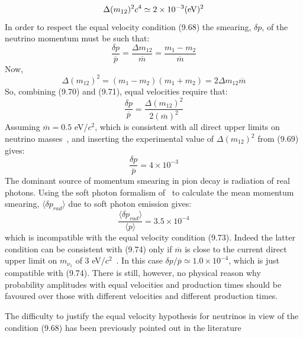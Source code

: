 \documentclass [12pt]{article}
\begin{document}
{       \begin{equation}
      \Delta(m_{12})^2 c^4 \simeq 2 \times 10^{-3} (\rm{eV})^2
        \end{equation}
    In order to respect the equal velocity condition (9.68) the smearing, $\delta p$, of the
    neutrino momentum must be such that:
       \begin{equation}
       \frac{\delta p}{\overline{p}} = \frac{\Delta m_{12}}{\overline{m}} = \frac{m_1-m_2}{\overline{m}} 
       \end{equation}
      Now,
        \begin{equation}
   \Delta(m_{12})^2 = (m_1-m_2)(m_1+m_2) = 2 \Delta m_{12} \overline{m}
      \end{equation}
     So, combining (9.70) and (9.71), equal velocities require that:
         \begin{equation}
       \frac{\delta p}{\overline{p}} = \frac{\Delta(m_{12})^2}{ 2(\overline{m})^2}  
       \end{equation}
    Assuming $\overline{m} = 0.5$ eV/$c^2$, which is consistent with all direct upper limits
 on neutrino masses~\cite{PDG04}, and inserting the experimental value of $\Delta(m_{12})^2$
  from (9.69) gives:
      \begin{equation}
       \frac{\delta p}{\overline{p}} = 4 \times 10^{-3} 
       \end{equation}  
    The dominant source of momentum smearing in pion decay is radiation of real photons.
 Using the soft photon formalism of~\cite{RK} to calculate the mean momentum smearing,
   $\langle \delta p_{rad} \rangle$ due to soft photon emission gives:
     \begin{equation}
       \frac{\langle \delta p_{rad} \rangle}{\langle p \rangle} = 3.5 \times 10^{-4} 
       \end{equation} 
    which is incompatible with the equal velocity condition (9.73). Indeed the latter condition
   can be consistent with (9.74) only if $\overline{m}$ is close to the current direct upper limit
   on $m_{\nu_1}$ of 3 eV/$c^2$~\cite{PDG04}. In this case $\delta p/{\overline{p}}\simeq 1.0 \times 10^{-4}$,
   which is just compatible with (9.74). There is still, however, no physical reason why 
   probability amplitudes with equal velocities and production times should be 
   favoured over those with different velocities and different production times.
   \par The difficulty to justify the equal velocity hypothesis for neutrinos in
    view of the condition (9.68) has been previously pointed out in the literature~\cite{DeLeo,Okun}
}
\end{document}
